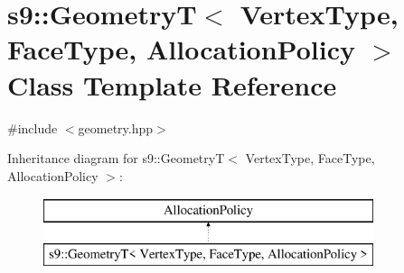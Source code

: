 \hypertarget{classs9_1_1GeometryT}{\section{s9\-:\-:Geometry\-T$<$ Vertex\-Type, Face\-Type, Allocation\-Policy $>$ Class Template Reference}
\label{classs9_1_1GeometryT}
}


{\ttfamily \#include $<$geometry.\-hpp$>$}

Inheritance diagram for s9\-:\-:Geometry\-T$<$ Vertex\-Type, Face\-Type, Allocation\-Policy $>$\-:\begin{figure}[H]
\begin{center}
\leavevmode
\includegraphics[height=2.000000cm]{classs9_1_1GeometryT}
\end{center}
\end{figure}
